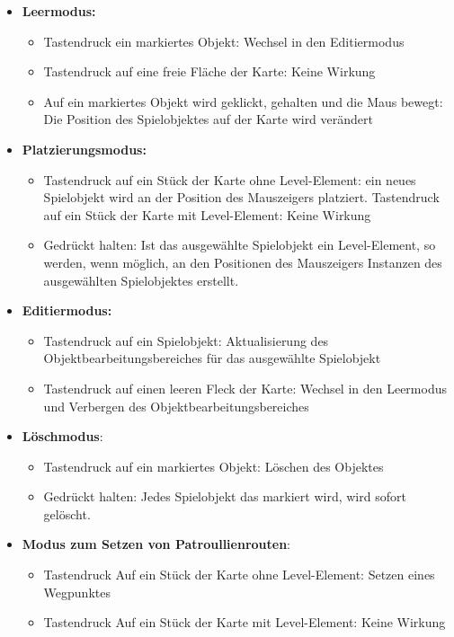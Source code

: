 \begin{itemize}
	\item \textbf{Leermodus:} 	
	\begin {itemize}
	\item Tastendruck ein markiertes Objekt: Wechsel in den Editiermodus
	\item Tastendruck auf eine freie Fläche der Karte: Keine Wirkung
	\item Auf ein markiertes Objekt wird geklickt, gehalten und die Maus bewegt: Die Position des Spielobjektes auf der Karte wird verändert
	\end{itemize}
	\item \textbf{Platzierungsmodus:} 
	\begin{itemize}
	\item Tastendruck auf ein Stück der Karte ohne Level-Element: ein neues Spielobjekt wird an der Position des Mauszeigers platziert.
	Tastendruck auf ein Stück der Karte mit Level-Element: Keine Wirkung
	\item Gedrückt halten: Ist das ausgewählte Spielobjekt ein Level-Element, so werden, wenn möglich, an den Positionen des Mauszeigers Instanzen des ausgewählten Spielobjektes erstellt.
	\end{itemize} 
	\item \textbf{Editiermodus:} 
	\begin{itemize}
	\item Tastendruck auf ein Spielobjekt: Aktualisierung des Objektbearbeitungsbereiches für das ausgewählte Spielobjekt
	\item Tastendruck auf einen leeren Fleck der Karte: Wechsel in den Leermodus und Verbergen des Objektbearbeitungsbereiches
	\end{itemize} 
	\item \textbf{Löschmodus}: 
	\begin{itemize}
	\item Tastendruck auf ein markiertes Objekt: Löschen des Objektes
	\item Gedrückt halten: Jedes Spielobjekt das markiert wird, wird sofort gelöscht.
	\end{itemize}
	\item \textbf{Modus zum Setzen von Patroullienrouten}: 
	\begin{itemize}
	\item Tastendruck Auf ein Stück der Karte ohne Level-Element: Setzen eines Wegpunktes
	\item Tastendruck Auf ein Stück der Karte mit Level-Element: Keine Wirkung
	\end{itemize}  
\end{itemize}


